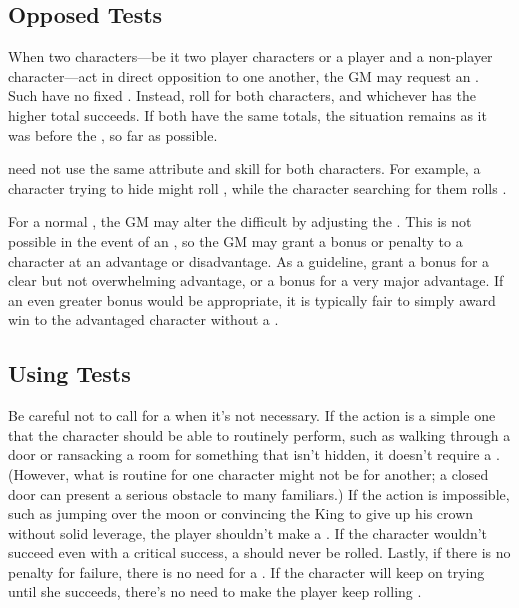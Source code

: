 \subsection{Opposed Tests}

When two characters---be it two player characters or a player and a non-player character---act in direct opposition to one another, the GM may request an {\opposedtest}.
Such {\tests} have no fixed {\tn}.
Instead, roll for both characters, and whichever has the higher total succeeds.
If both have the same totals, the situation remains as it was before the {\test}, so far as possible.

\capital{\opposedtests} need not use the same attribute and skill for both characters.
For example, a character trying to hide might roll , while the character searching for them rolls .

For a normal {\test}, the GM may alter the difficult by adjusting the {\tn}.
This is not possible in the event of an {\opposedtest}, so the GM may grant a bonus or penalty to a character at an advantage or disadvantage.
As a guideline, grant a  bonus for a clear but not overwhelming advantage, or a  bonus for a very major advantage.
If an even greater bonus would be appropriate, it is typically fair to simply award win to the advantaged character without a {\test}.

\subsection{Using Tests}

Be careful not to call for a {\test} when it's not necessary.
If the action is a simple one that the character should be able to routinely perform, such as walking through a door or ransacking a room for something that isn't hidden, it doesn't require a {\test}.
(However, what is routine for one character might not be for another; a closed door can present a serious obstacle to many familiars.)
If the action is impossible, such as jumping over the moon or convincing the King to give up his crown without solid leverage, the player shouldn't make a {\test}.
If the character wouldn't succeed even with a critical success, a {\test} should never be rolled.
Lastly, if there is no penalty for failure, there is no need for a {\test}.
If the character will keep on trying until she succeeds, there's no need to make the player keep rolling {\tests}.

